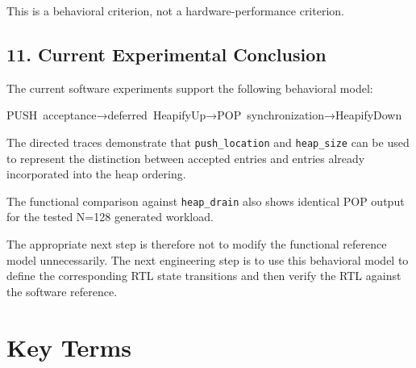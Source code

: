 \documentclass[11pt,a4paper]{article}
\begin{document}
This is a behavioral criterion, not a hardware-performance criterion.

\subsection{11. Current Experimental Conclusion}

The current software experiments support the following behavioral model:

PUSH acceptance→deferred HeapifyUp→POP synchronization→HeapifyDown

The directed traces demonstrate that
\texttt{push_location} and \texttt{heap_size} can be used to represent
the distinction between accepted entries and entries already incorporated
into the heap ordering.

The functional comparison against \texttt{heap_drain} also shows
identical POP output for the tested N=128 generated workload.

The appropriate next step is therefore not to modify the functional
reference model unnecessarily. The next engineering step is to use this
behavioral model to define the corresponding RTL state transitions and
then verify the RTL against the software reference.

\section{Key Terms}
\end{document}
